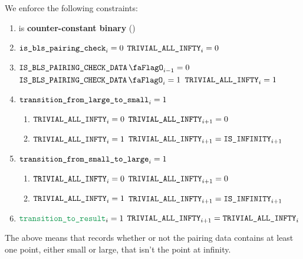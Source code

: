 
We enforce the following constraints:
\begin{enumerate}
    \item \trivialAllInf{} is \textbf{counter-constant binary} \quad (\trash)
    \item \If $\texttt{is\_bls\_pairing\_check} _{i} = 0$ \Then $\texttt{TRIVIAL\_ALL\_INFTY} _{i} = 0$
    \item \If $\isBlsPairingCheckData_{i - 1} = 0$ \et $\isBlsPairingCheckData _{i} = 1$ \Then $\texttt{TRIVIAL\_ALL\_INFTY}_{i} = 1$
    \item \If $\texttt{transition\_from\_large\_to\_small}_{i} = 1$ \Then 
          \begin{enumerate}
              \item \If $\texttt{TRIVIAL\_ALL\_INFTY} _{i} = 0$ \Then $\texttt{TRIVIAL\_ALL\_INFTY} _{i + 1} = 0$
              \item \If $\texttt{TRIVIAL\_ALL\_INFTY} _{i} = 1$ \Then $\texttt{TRIVIAL\_ALL\_INFTY} _{i + 1} = \texttt{IS\_INFINITY}_{i + 1}$
          \end{enumerate}
    \item \If $\texttt{transition\_from\_small\_to\_large}_{i} = 1$ \Then
          \begin{enumerate}
              \item \If $\texttt{TRIVIAL\_ALL\_INFTY} _{i} = 0$ \Then $\texttt{TRIVIAL\_ALL\_INFTY} _{i + 1} = 0$
              \item \If $\texttt{TRIVIAL\_ALL\_INFTY} _{i} = 1$ \Then $\texttt{TRIVIAL\_ALL\_INFTY} _{i + 1} = \texttt{IS\_INFINITY}_{i + 1}$
          \end{enumerate}
    \item \If $\locTransitionToResult_{i} = 1$ \Then $\texttt{TRIVIAL\_ALL\_INFTY}_{i+1} = \texttt{TRIVIAL\_ALL\_INFTY}_{i}$
\end{enumerate}
\saNote{} The above means that \trivialAllInf{} records whether or not the pairing data contains at least one point, either small or large, that isn't the point at infinity.

